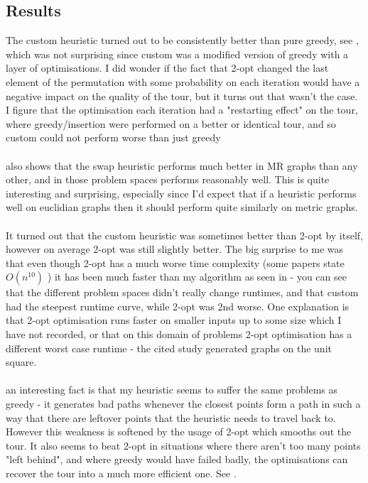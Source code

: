 \documentclass{report}
\begin{document}
\subsection{Results}
The custom heuristic turned out to be consistently better than pure greedy, see , which was not surprising since custom was a modified version of greedy with a layer of optimisations. I did wonder if the fact that 2-opt changed the last element of the permutation with some probability on each iteration would have a negative impact on the quality of the tour, but it turns out that wasn't the case. I figure that the optimisation each iteration had a "restarting effect" on the tour, where greedy/insertion were performed on a better or identical tour, and so custom could not perform worse than just greedy\\\\
 also shows that the swap heuristic performs much better in MR graphs than any other, and in those problem spaces performs reasonably well. This is quite interesting and surprising, especially since I'd expect that if a heuristic performs well on euclidian graphs then it should perform quite similarly on metric graphs.\\\\
It turned out that the custom heuristic was sometimes better than 2-opt by itself, however on average 2-opt was still slightly better. The big surprise to me was that even though 2-opt has a much worse time complexity (some papers state $O(n^{10})$ )\cite{2-opt} it has been much faster than my algorithm as seen in  - you can see that the different problem spaces didn't really change runtimes, and that custom had the steepest runtime curve, while 2-opt was 2nd worse. One explanation is that 2-opt optimisation runs faster on smaller inputs up to some size which I have not recorded, or that on this domain of problems 2-opt optimisation has a different worst case runtime - the cited study generated graphs on the unit square.\\\\
an interesting fact is that my heuristic seems to suffer the same problems as greedy - it generates bad paths whenever the closest points form a path in such a way that there are leftover points that the heuristic needs to travel back to. However this weakness is softened by the usage of 2-opt which smooths out the tour. It also seems to beat 2-opt in situations where there aren't too many points "left behind", and where greedy would have failed badly, the optimisations can recover the tour into a much more efficient one. See .
\end{document}
